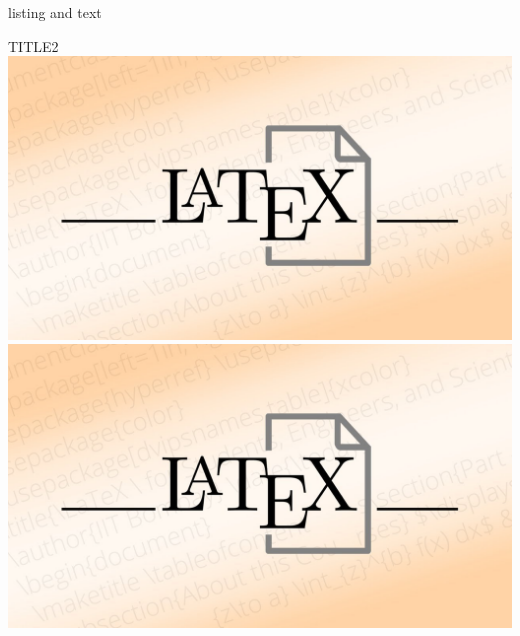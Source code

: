 \documentclass[]{myHOWTO-V001}
\begin{document}
\begin{myTEXEXdoclst}{}{listing and text}
\centering
\begin{myFIGlst}{TITLE2}{}
	\includegraphics[scale=0.15,trim=80mm 80mm 80mm 60mm,clip]{LaTeX.jpg}
	\includegraphics[scale=0.15,trim=80mm 80mm 80mm 60mm,clip]{LaTeX.jpg}
\end{myFIGlst}
\end{myTEXEXdoclst}

%
%

\clearpage
\pagestyle{empty}
\printbibliography[heading=bibnumbered]
\clearpage
\pagestyle{plain}

%
%
	
\end{document}

